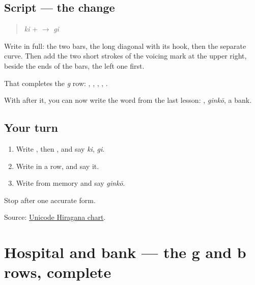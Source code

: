 \subsection*{Script — the change}

\begin{quote}
\textbf{} \emph{ki} + \textbf{} $\to$ \textbf{} \emph{gi}
\end{quote}

Write \textbf{} in full: the two bars, the long diagonal with its hook, then the separate curve. Then add the two short strokes of the voicing mark at the upper right, beside the ends of the bars, the left one first.

That completes the \emph{g} row: \textbf{}, \textbf{}, \textbf{}, \textbf{}, \textbf{}.

With \textbf{} after it, you can now write the word from the last lesson: \textbf{}, \emph{ginkō}, a bank.

\subsection*{Your turn}
\begin{enumerate}
\raggedright
  \item Write \textbf{}, then \textbf{}, and say \emph{ki}, \emph{gi}.
  \item Write \textbf{    } in a row, and say it.
  \item Write \textbf{} from memory and say \emph{ginkō}.
\end{enumerate}

\begin{tcolorbox}[breakable,colback=teal!4,colframe=teal!35!black,title={Before you move on}]
Stop after one accurate form.

Source: \href{https://www.unicode.org/charts/PDF/U3040.pdf}{Unicode Hiragana chart}.
\end{tcolorbox}
\section[(dialogue)]{Hospital and bank — the g and b rows, complete}

\label{lesson:JA-R135-hospital-and-bank}



